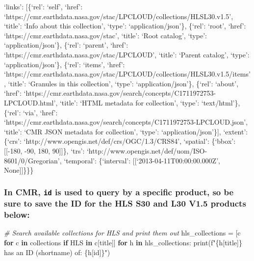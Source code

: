 \documentclass[
  letterpaper,
]{scrartcl}
\newenvironment{Shaded}{}{}
\newcommand{\BuiltInTok}[1]{#1}
\newcommand{\CommentTok}[1]{\textcolor[rgb]{0.38,0.63,0.69}{\textit{#1}}}
\newcommand{\ControlFlowTok}[1]{\textcolor[rgb]{0.00,0.44,0.13}{\textbf{#1}}}
\newcommand{\KeywordTok}[1]{\textcolor[rgb]{0.00,0.44,0.13}{\textbf{#1}}}
\newcommand{\NormalTok}[1]{#1}
\newcommand{\OperatorTok}[1]{\textcolor[rgb]{0.40,0.40,0.40}{#1}}
\newcommand{\SpecialCharTok}[1]{\textcolor[rgb]{0.25,0.44,0.63}{#1}}
\newcommand{\SpecialStringTok}[1]{\textcolor[rgb]{0.73,0.40,0.53}{#1}}
\newcommand{\StringTok}[1]{\textcolor[rgb]{0.25,0.44,0.63}{#1}}
\begin{document}
`links': {[}\{`rel': `self', `href':
`https://cmr.earthdata.nasa.gov/stac/LPCLOUD/collections/HLSL30.v1.5',
`title': `Info about this collection', `type': `application/json'\},
\{`rel': `root', `href': `https://cmr.earthdata.nasa.gov/stac', `title':
`Root catalog', `type': `application/json'\}, \{`rel': `parent', `href':
`https://cmr.earthdata.nasa.gov/stac/LPCLOUD', `title': `Parent
catalog', `type': `application/json'\}, \{`rel': `items', `href':
`https://cmr.earthdata.nasa.gov/stac/LPCLOUD/collections/HLSL30.v1.5/items',
`title': `Granules in this collection', `type': `application/json'\},
\{`rel': `about', `href':
`https://cmr.earthdata.nasa.gov/search/concepts/C1711972753-LPCLOUD.html',
`title': `HTML metadata for collection', `type': `text/html'\}, \{`rel':
`via', `href':
`https://cmr.earthdata.nasa.gov/search/concepts/C1711972753-LPCLOUD.json',
`title': `CMR JSON metadata for collection', `type':
`application/json'\}{]}, `extent': \{`crs':
`http://www.opengis.net/def/crs/OGC/1.3/CRS84', `spatial': \{`bbox':
{[}{[}-180, -90, 180, 90{]}{]}\}, `trs':
`http://www.opengis.net/def/uom/ISO-8601/0/Gregorian', `temporal':
\{`interval': {[}{[}`2013-04-11T00:00:00.000Z', None{]}{]}\}\}\}

\hypertarget{in-cmr-id-is-used-to-query-by-a-specific-product-so-be-sure-to-save-the-id-for-the-hls-s30-and-l30-v1.5-products-below}{%
\subsubsection{\texorpdfstring{In CMR, \texttt{id} is used to query by a
specific product, so be sure to save the ID for the HLS S30 and L30 V1.5
products
below:}{In CMR, id is used to query by a specific product, so be sure to save the ID for the HLS S30 and L30 V1.5 products below:}}\label{in-cmr-id-is-used-to-query-by-a-specific-product-so-be-sure-to-save-the-id-for-the-hls-s30-and-l30-v1.5-products-below}}

\begin{Shaded}
\begin{Highlighting}[]
\CommentTok{\# Search available collections for HLS and print them out}
\NormalTok{hls\_collections }\OperatorTok{=}\NormalTok{ [c }\ControlFlowTok{for}\NormalTok{ c }\KeywordTok{in}\NormalTok{ collections }\ControlFlowTok{if} \StringTok{\textquotesingle{}HLS\textquotesingle{}} \KeywordTok{in}\NormalTok{ c[}\StringTok{\textquotesingle{}title\textquotesingle{}}\NormalTok{]]}
\ControlFlowTok{for}\NormalTok{ h }\KeywordTok{in}\NormalTok{ hls\_collections: }\BuiltInTok{print}\NormalTok{(}\SpecialStringTok{f"}\SpecialCharTok{\{h}\NormalTok{[}\StringTok{\textquotesingle{}title\textquotesingle{}}\NormalTok{]}\SpecialCharTok{\}}\SpecialStringTok{ has an ID (shortname) of: }\SpecialCharTok{\{h}\NormalTok{[}\StringTok{\textquotesingle{}id\textquotesingle{}}\NormalTok{]}\SpecialCharTok{\}}\SpecialStringTok{"}\NormalTok{)}
\end{Highlighting}
\end{Shaded}
\end{document}
